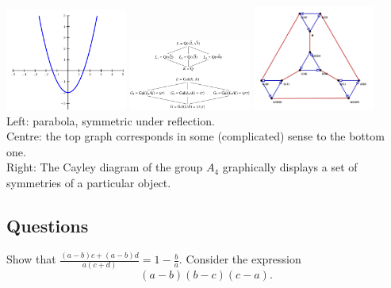 \documentclass{exam}
\begin{document}
\begin{center}
  \includegraphics[width=0.3\textwidth]{parabola}
  \includegraphics[width=0.3\textwidth]{galois}
  \includegraphics[width=0.3\textwidth]{cayley}\\
  \small{Left: parabola, symmetric under reflection.\\
         Centre: the top graph corresponds in some (complicated) sense to the bottom one.\\
         Right: The Cayley diagram of the group $ A_4 $ graphically displays a set of symmetries of a particular object.}
\end{center}

\subsection*{Questions}
\begin{questions}

  \question Show that $ \frac{(a - b)c + (a - b)d}{a(c + d)} = 1 - \frac{b}{a} $.
  \question Consider the expression
    \begin{equation}
      (a - b)(b - c)(c - a) \tag{*}.
    \end{equation}

\end{questions}
\end{document}
